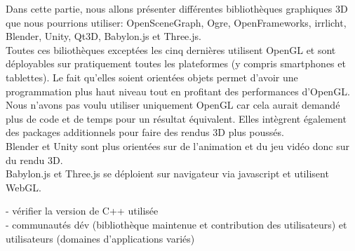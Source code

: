 Dans cette partie, nous allons présenter différentes bibliothèques graphiques 3D que nous pourrions utiliser: OpenSceneGraph, Ogre, OpenFrameworks, irrlicht, Blender, Unity, Qt3D, Babylon.js et Three.js. \\
Toutes ces biliothèques exceptées les cinq dernières utilisent OpenGL et sont déployables sur pratiquement toutes les plateformes (y compris smartphones et tablettes). Le fait qu'elles soient orientées objets permet d'avoir une programmation plus haut niveau tout en profitant des performances d'OpenGL. Nous n'avons pas voulu utiliser uniquement OpenGL car cela aurait demandé plus de code et de temps pour un résultat équivalent. Elles intègrent également des packages additionnels pour faire des rendus 3D plus poussés. \\
Blender et Unity sont plus orientées sur de l'animation et du jeu vidéo donc sur du rendu 3D. \\
Babylon.js et Three.js se déploient sur navigateur via javascript et utilisent WebGL.

- vérifier la version de C++ utilisée \\
- communautés dév (bibliothèque maintenue et contribution des utilisateurs) et utilisateurs (domaines d'applications variés) \\
